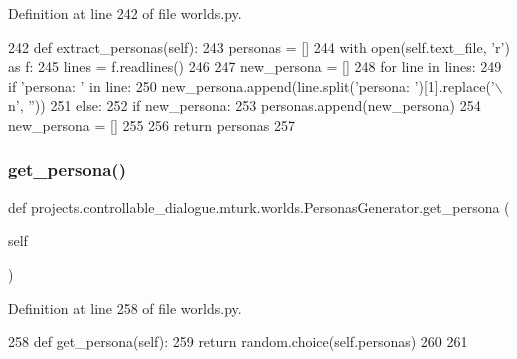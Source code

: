 Definition at line 242 of file worlds.\+py.


\begin{DoxyCode}
242     \textcolor{keyword}{def }extract\_personas(self):
243         personas = []
244         with open(self.text\_file, \textcolor{stringliteral}{'r') as f:}
245 \textcolor{stringliteral}{            lines = f.readlines()}
246 \textcolor{stringliteral}{}
247 \textcolor{stringliteral}{        new\_persona = []}
248 \textcolor{stringliteral}{        }\textcolor{keywordflow}{for} line \textcolor{keywordflow}{in} lines:
249             \textcolor{keywordflow}{if} \textcolor{stringliteral}{'persona: '} \textcolor{keywordflow}{in} line:
250                 new\_persona.append(line.split(\textcolor{stringliteral}{'persona: '})[1].replace(\textcolor{stringliteral}{'\(\backslash\)n'}, \textcolor{stringliteral}{''}))
251             \textcolor{keywordflow}{else}:
252                 \textcolor{keywordflow}{if} new\_persona:
253                     personas.append(new\_persona)
254                     new\_persona = []
255 
256         \textcolor{keywordflow}{return} personas
257 
\end{DoxyCode}
\mbox{\label{classprojects_1_1controllable__dialogue_1_1mturk_1_1worlds_1_1PersonasGenerator_a788311f725f83f4f6da141df5241ca11}} 
\subsubsection{\texorpdfstring{get\+\_\+persona()}{get\_persona()}}
{\footnotesize\ttfamily def projects.\+controllable\+\_\+dialogue.\+mturk.\+worlds.\+Personas\+Generator.\+get\+\_\+persona (\begin{DoxyParamCaption}\item[{}]{self }\end{DoxyParamCaption})}



Definition at line 258 of file worlds.\+py.


\begin{DoxyCode}
258     \textcolor{keyword}{def }get\_persona(self):
259         \textcolor{keywordflow}{return} random.choice(self.personas)
260 
261 
\end{DoxyCode}


